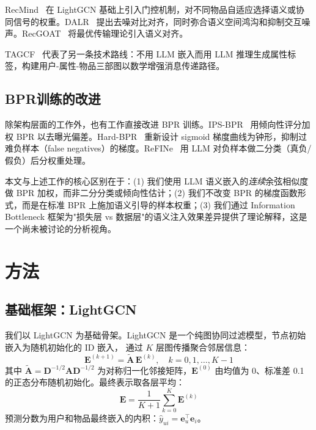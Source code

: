 \documentclass[11pt,a4paper]{article}
\begin{document}
RecMind~\cite{Xue2026RecMind} 在 LightGCN 基础上引入门控机制，对不同物品自适应选择语义或协同信号的权重。DALR~\cite{Peng2024DALR} 提出去噪对比对齐，同时弥合语义空间鸿沟和抑制交互噪声。RecGOAT~\cite{Li2026RecGOAT} 将最优传输理论引入语义对齐。

TAGCF~\cite{Meng2026TAGCF} 代表了另一条技术路线：不用 LLM 嵌入而用 LLM 推理生成属性标签，构建用户-属性-物品三部图以数学增强消息传递路径。

\subsection{BPR训练的改进}

除架构层面的工作外，也有工作直接改进 BPR 训练。IPS-BPR~\cite{Raja2025IPS} 用倾向性评分加权 BPR 以去曝光偏差。Hard-BPR~\cite{Shi2024HardBPR} 重新设计 sigmoid 梯度曲线为钟形，抑制过难负样本（false negatives）的梯度。ReFINe~\cite{Jeong2025ReFINe} 用 LLM 对负样本做二分类（真负/假负）后分权重处理。

本文与上述工作的核心区别在于：(1) 我们使用 LLM 语义嵌入的\emph{连续}余弦相似度做 BPR 加权，而非二分分类或倾向性估计；(2) 我们不改变 BPR 的梯度函数形式，而是在标准 BPR 上施加语义引导的样本权重；(3) 我们通过 Information Bottleneck 框架为"损失层 vs 数据层"的语义注入效果差异提供了理论解释，这是一个尚未被讨论的分析视角。

\section{方法}

\subsection{基础框架：LightGCN}

我们以 LightGCN 为基础骨架。LightGCN 是一个纯图协同过滤模型，节点初始嵌入为随机初始化的 ID 嵌入，
通过 $K$ 层图传播聚合邻居信息：
\begin{equation}
    \mathbf{E}^{(k+1)} = \tilde{\mathbf{A}} \, \mathbf{E}^{(k)}, \quad k = 0,1,\dots,K-1
\end{equation}
其中 $\tilde{\mathbf{A}} = \mathbf{D}^{-1/2}\mathbf{A}\mathbf{D}^{-1/2}$ 为对称归一化邻接矩阵，$\mathbf{E}^{(0)}$ 由均值为 0、标准差 0.1 的正态分布随机初始化。最终表示取各层平均：
\begin{equation}
    \mathbf{E} = \frac{1}{K+1} \sum_{k=0}^{K} \mathbf{E}^{(k)}
\end{equation}
预测分数为用户和物品最终嵌入的内积：$\hat{y}_{ui} = \mathbf{e}_u^{\top} \mathbf{e}_i$。
\end{document}
